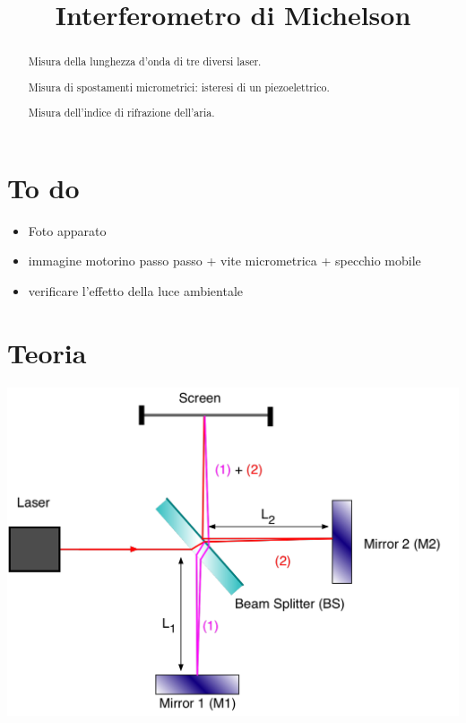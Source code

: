 \documentclass[a4paper]{article}
\begin{document}
	\title{Interferometro di Michelson}
	\maketitle
	
	\section*{To do}
	\begin{itemize}
		\item Foto apparato
		\item immagine motorino passo passo + vite micrometrica + specchio mobile
		\item verificare l'effetto della luce ambientale
	\end{itemize}
	
	
	\begin{abstract}
		 Misura della lunghezza d'onda di tre diversi laser.
		 
		 Misura di spostamenti micrometrici: isteresi di un piezoelettrico.
		 
		 Misura dell'indice di rifrazione dell'aria.
	\end{abstract}

\section{Teoria}
\begin{center}
	\begin{minipage}[c]{.50\textwidth}
		\centering
		\includegraphics[width=1\textwidth]{teoria_michelson.png}
	\end{minipage}
	\begin{minipage}[c]{.40\textwidth}
	\end{minipage}
\end{center}
\end{document}
